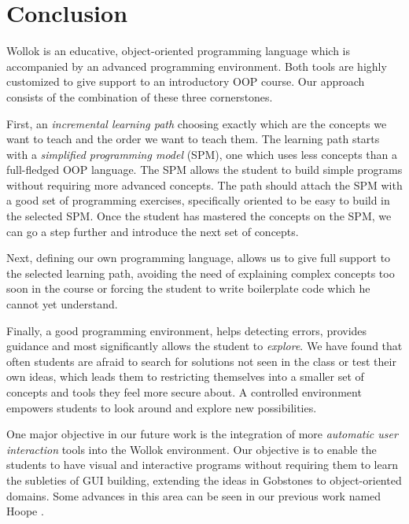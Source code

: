 \section{Conclusion}
\label{sec:conclusion}



Wollok is an educative, object-oriented programming language which is accompanied by an advanced programming environment.
Both tools are highly customized to give support to an introductory OOP course.
Our approach consists of the combination of these three cornerstones.

First, an \emph{incremental learning path} choosing exactly which are the concepts we want to teach and the order we want to teach them.
The learning path starts with a \emph{simplified programming model} (SPM), \ie one which uses less concepts than a full-fledged OOP language.
The SPM allows the student to build simple programs without requiring more advanced concepts.
The path should attach the SPM with a good set of programming exercises, specifically oriented to be easy to build in the selected SPM.
Once the student has mastered the concepts on the SPM, we can go a step further and introduce the next set of concepts.

Next, defining our own programming language, allows us to give full support to the selected learning path, 
avoiding the need of explaining complex concepts too soon in the course or forcing the student to write boilerplate code which he cannot yet understand.

Finally, a good programming environment, helps detecting errors, provides guidance and most significantly allows the student to \emph{explore}.
We have found that often students are afraid to search for solutions not seen in the class or test their own ideas, 
which leads them to restricting themselves into a smaller set of concepts and tools they feel more secure about.
A controlled environment empowers students to look around and explore new possibilities.

\medskip

\label{sec:furtherWork}
One major objective in our future work is the integration of more \emph{automatic user interaction} tools into the Wollok environment.
Our objective is to enable the students to have visual and interactive programs without requiring them to learn the subleties of GUI building, 
extending the ideas in Gobstones \cite{lopez_nombre_2012} to object-oriented domains.
Some advances in this area can be seen in our previous work named Hoope \cite{hoope}.


